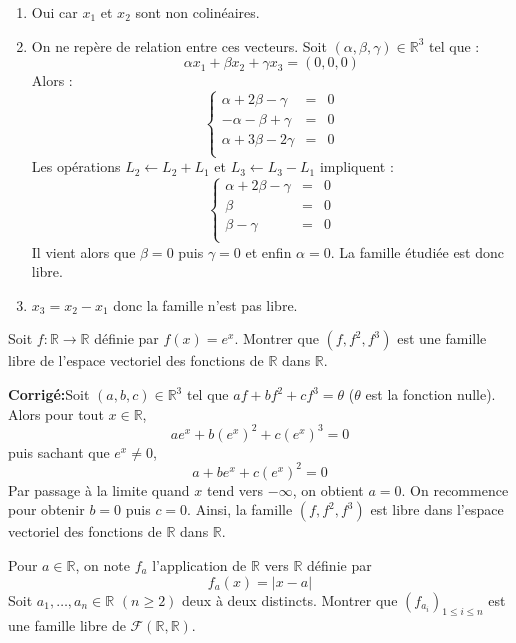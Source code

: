\documentclass[a4paper,twoside,french,10pt]{VcCours}
\newcommand{\corr}{\textbf{Corrigé:}}
\begin{document}
\begin{enumerate}
\item Oui car $x_1$ et $x_2$ sont non colinéaires.
\item On ne repère de relation entre ces vecteurs. Soit $(\alpha, \beta, \gamma) \in \mathbb{R}^3$ tel que :
$$ \alpha x_1 + \beta x_2 + \gamma x_3 = (0,0,0)$$
Alors :
$$ \left\lbrace \begin{array}{ccl}
\alpha + 2 \beta - \gamma & = & 0 \\
- \alpha - \beta + \gamma & = & 0 \\
\alpha+ 3 \beta -2 \gamma & = & 0 \\
\end{array}\right.$$
Les opérations $L_2 \leftarrow L_2+L_1$ et $L_3 \leftarrow L_3- L_1$ impliquent :
$$ \left\lbrace \begin{array}{rcl}
\alpha + 2 \beta - \gamma & = & 0 \\
  \beta & = & 0 \\
  \beta - \gamma & = & 0 \\
\end{array}\right.$$
Il vient alors que $\beta=0$ puis $\gamma=0$ et enfin $\alpha=0$. La famille étudiée est donc libre.
\item $x_3=x_2-x_1$ donc la famille n'est pas libre.
\end{enumerate}

\medskip


\begin{Exercice}{} Soit $f : \mathbb{R} \rightarrow \mathbb{R}$ définie par $f(x)=e^x$. Montrer que $(f,f^2,f^3)$ est une famille libre de l'espace vectoriel des fonctions de $\mathbb{R}$ dans $\mathbb{R}$.
\end{Exercice}

\corr Soit $(a,b,c) \in \mathbb{R}^3$ tel que $af+bf^2+cf^3 = \theta$ ($\theta$ est la fonction nulle). Alors pour tout $x \in \mathbb{R}$,
$$ a e^x+ b (e^x)^2 + c(e^x)^3 = 0 $$
puis sachant que $e^x \neq 0$,
$$ a + be^x + c (e^x)^2 = 0$$
Par passage à la limite quand $x$ tend vers $- \infty$, on obtient $a=0$. On recommence pour obtenir $b=0$ puis $c=0$. Ainsi, la famille $(f,f^2,f^3)$ est libre dans l'espace vectoriel des fonctions de $\mathbb{R}$ dans $\mathbb{R}$.

\medskip

\begin{Exercice}{} Pour $a \in \mathbb{R}$, on note $f_a$ l'application de $\mathbb{R}$ vers $\mathbb{R}$ définie par 
$$f_a(x) = \vert x - a \vert$$
Soit $a_1, \ldots, a_n \in \mathbb{R}$ $(n \geq 2)$ deux à deux distincts. Montrer que $(f_{a_i})_{1 \leq i \leq n}$ est une famille libre de $\mathcal{F}(\mathbb{R}, \mathbb{R})$.
\end{Exercice} 
\end{document}
